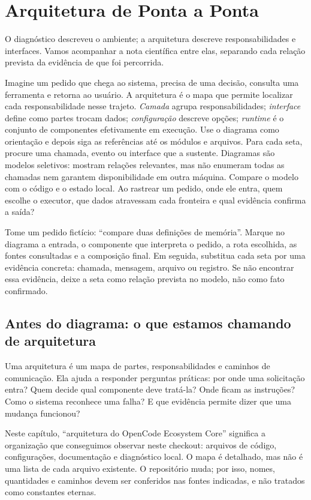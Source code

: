 \chapter{Arquitetura de Ponta a Ponta}

O diagnóstico descreveu o ambiente; a arquitetura descreve responsabilidades e interfaces. Vamos acompanhar a nota científica entre elas, separando cada relação prevista da evidência de que foi percorrida.


\roteirodidatico
{Imagine um pedido que chega ao sistema, precisa de uma decisão, consulta uma ferramenta e retorna ao usuário. A arquitetura é o mapa que permite localizar cada responsabilidade nesse trajeto.}
{\emph{Camada} agrupa responsabilidades; \emph{interface} define como partes trocam dados; \emph{configuração} descreve opções; \emph{runtime} é o conjunto de componentes efetivamente em execução.}
{Use o diagrama como orientação e depois siga as referências até os módulos e arquivos. Para cada seta, procure uma chamada, evento ou interface que a sustente.}
{Diagramas são modelos seletivos: mostram relações relevantes, mas não enumeram todas as chamadas nem garantem disponibilidade em outra máquina. Compare o modelo com o código e o estado local.}
{Ao rastrear um pedido, onde ele entra, quem escolhe o executor, que dados atravessam cada fronteira e qual evidência confirma a saída?}

{Tome um pedido fictício: ``compare duas definições de memória''. Marque no diagrama a entrada, o componente que interpreta o pedido, a rota escolhida, as fontes consultadas e a composição final. Em seguida, substitua cada seta por uma evidência concreta: chamada, mensagem, arquivo ou registro. Se não encontrar essa evidência, deixe a seta como relação prevista no modelo, não como fato confirmado.}

\section{Antes do diagrama: o que estamos chamando de arquitetura}

\begin{descricao}
Uma arquitetura é um mapa de partes, responsabilidades e caminhos de
comunicação. Ela ajuda a responder perguntas práticas: por onde uma solicitação
entra? Quem decide qual componente deve tratá-la? Onde ficam as instruções? Como
o sistema reconhece uma falha? E que evidência permite dizer que uma mudança
funcionou?

Neste capítulo, ``arquitetura do OpenCode Ecosystem Core'' significa a
organização que conseguimos observar neste checkout: arquivos de código,
configurações, documentação e diagnóstico local. O mapa é detalhado, mas não é
uma lista de cada arquivo existente. O repositório muda; por isso, nomes,
quantidades e caminhos devem ser conferidos nas fontes indicadas, e não tratados
como constantes eternas.
\end{descricao}

